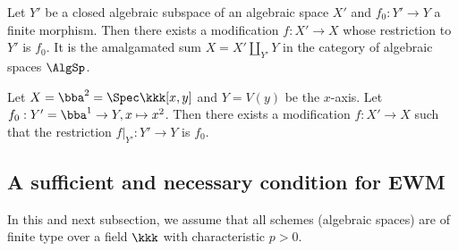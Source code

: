     \begin{theorem}\label{thm:finite_modification}
        Let \(Y'\) be a closed algebraic subspace of an algebraic space \(X'\) and \(f_0:Y' \to Y\) a finite morphism.
        Then there exists a modification \(f:X' \to X\) whose restriction to \(Y'\) is \(f_0\).
        It is the amalgamated sum \(X = X' \amalg_{Y'} Y\) in the category of algebraic spaces \(\AlgSp\).
    \end{theorem}

    \begin{example}\label{eg:finite_modification_of_line_in_plane}
        Let \(X = \bba^2 = \Spec \kkk[x,y]\) and \(Y = V(y)\) be the \(x\)-axis.
        Let \(f_0:Y'=\bba^1 \to Y, x \mapsto x^2\).
        Then there exists a modification \(f:X' \to X\) such that the restriction \(f|_{Y'}: Y' \to Y\) is \(f_0\).
    \end{example}


\subsection{A sufficient and necessary condition for EWM}

    In this and next subsection, we assume that all schemes (algebraic spaces) are of finite type over a field \(\kkk\) with characteristic \(p>0\).

